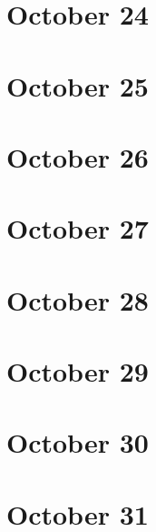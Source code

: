 \section{October 24}

\section{October 25}

\section{October 26}

\section{October 27}

\section{October 28}

\section{October 29}

\section{October 30}

\section{October 31}

